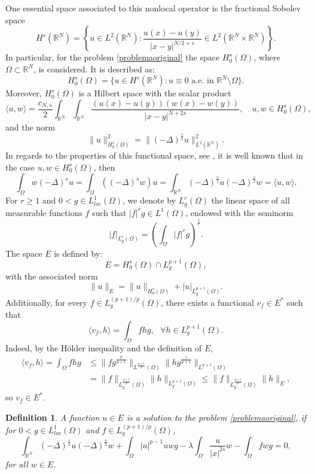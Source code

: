 \documentclass[preprint,12pt]{elsarticle}
\newtheorem{definition}[theorem]{Definition}
\begin{document}
		
		One essential space associated to this nonlocal operator is the fractional Sobolev space 
		\[H^s(\mathbb{R}^N)=\left\{ u\in L^2(\mathbb{R}^N): \frac{u(x)-u(y)}{|x-y|^{N/2+s}}\in L^2(\mathbb{R}^N\times \mathbb{R}^N) \right\}.\]
		In particular, for the problem \eqref{problemaoriginal} the space $H_0^s(\Omega)$, where $\Omega \subset \mathbb{R}^N$, is considered. It is described as:
		\[H_0^s(\Omega)=\{u\in H^s(\mathbb{R}^N): u\equiv 0 \textrm{ a.e. in } \mathbb{R}^N\setminus \Omega \}.\]
		Moreover, $H_0^s(\Omega)$ is a Hilbert space with the scalar product
		\[
		\langle u, w \rangle = \frac {c_{N,s}}2\int_{\mathbb{R}^N}  \int_{\mathbb{R}^N} \frac{(u(x)-u(y))(w(x)-w(y))}{|x-y|^{N+2s}},\quad  u,w\in H_0^s(\Omega),
		\]
		and the norm 
		\[ \|u\|^2_{H_0^s(\Omega)}=\|(-\Delta)^\frac{s}{2}u\|^2_{L^2(\mathbb{R}^N)}.\] 
		In regards to the properties of this functional space, see \cite{DGV}, it is well known that in the case $u, w \in H_0^s(\Omega)$, then  
		\[\displaystyle \int_\Omega w (-\Delta)^s u= \int_\Omega((-\Delta)^s w ) u  = \int_{\mathbb{R}^N} (-\Delta)^\frac{s}{2}u (-\Delta)^\frac{s}{2}w=\langle u, w \rangle.\]
		For $r\geq 1$ and $0<g\in L_{loc}^1(\Omega)$, we denote by $L^{r}_g(\Omega)$ the linear space of all measurable functions $f$ such that $|f|^{r}g\in L^1(\Omega)$, endowed with the seminorm 
		\[ |f|_{L^{r}_g(\Omega)}=\left(\int_{\Omega}|f|^{r}g\right)^{\frac{1}{r}}.\]	
		The space $E$ is defined by:
		\[E= H^s_0(\Omega)\cap L^{p+1}_g(\Omega),\]
		with the associated norm
		\[ \|u\|_E=\|u\|_{H^s_0(\Omega)}+|u|_{L^{p+1}_g(\Omega)}.\]
		Additionally, for every $f\in L^{(p+1)/p}_g(\Omega)$, there exists a functional $v_f\in E^*$ such that  
		\begin{equation}\label{DualE}
			\langle v_f, h
			\rangle = \int_{\Omega} fhg,\textit{ $\forall h\in L^{p+1}_g(\Omega)$.}
		\end{equation}
		Indeed, by the H\"older inequality and the definition of $E$,
		\begin{align*}
			\langle v_f, h
			\rangle= \int_{\Omega} fhg&\leq \|fg^{\frac{p}{p+1}}\|_{L^{\frac{p+1}{p}}(\Omega)} \|hg^{\frac{1}{p+1}}\|_{L^{p+1}(\Omega)}\\&= \|f\|_{L_g^{\frac{p+1}{p}}(\Omega)} \|h\|_{L_g^{p+1}(\Omega)}\leq \|f\|_{L_g^{\frac{p+1}{p}}(\Omega)} \|h\|_{E},
		\end{align*}
		so $v_f\in E^*$.
		
		
		\begin{definition}\label{def:sol}
			A function $u \in E$ is a solution to the problem \eqref{problemaoriginal}, if for $0<g\in L_{loc}^1(\Omega)$ and $f\in L_g^{(p+1)/p}(\Omega)$,
			\[\int_{\mathbb{R}^N}(-\Delta)^{\frac{s}{2}}u(-\Delta)^{\frac{s}{2}}w + \int_{\Omega}|u|^{p-1}uwg-\lambda \int_{\Omega}\frac{u}{|x|^{2s}}w-\int_{\Omega}fwg=0,\]
			for all $w\in E$.
		\end{definition}
		
\end{document}

